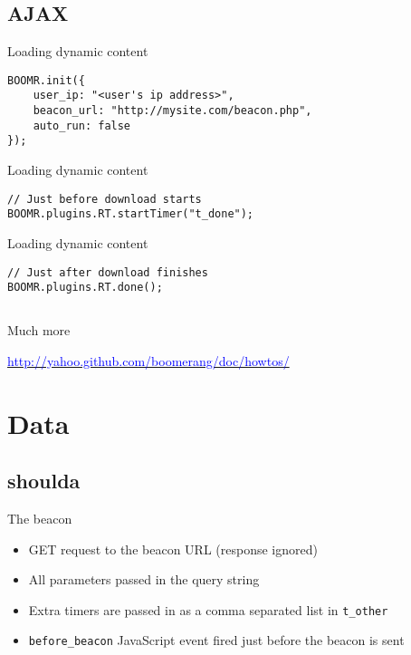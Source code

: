 \documentclass{beamer}
\begin{document}
\subsection{AJAX}
\begin{frame}[fragile]{Loading dynamic content}
\begin{verbatim}
BOOMR.init({
    user_ip: "<user's ip address>",
    beacon_url: "http://mysite.com/beacon.php",
    auto_run: false
});
\end{verbatim}
\end{frame}

\begin{frame}[fragile]{Loading dynamic content}
\begin{verbatim}
// Just before download starts
BOOMR.plugins.RT.startTimer("t_done");
\end{verbatim}
\end{frame}

\begin{frame}[fragile]{Loading dynamic content}
\begin{verbatim}
// Just after download finishes
BOOMR.plugins.RT.done();
\end{verbatim}
\end{frame}

\subsection{}

\begin{frame}{Much more}
  \begin{center}
  \href{http://yahoo.github.com/boomerang/doc/howtos/}{\textcolor{blue}{http://yahoo.github.com/boomerang/doc/howtos/}}
  \end{center}
\end{frame}

\section{Data}
\label{sec:data}

\subsection{shoulda}

\begin{frame}{The beacon}
  \begin{itemize}
  \item GET request to the beacon URL (response ignored)
  \item All parameters passed in the query string
  \item Extra timers are passed in as a comma separated list in \texttt{t\_other}
  \item \texttt{before\_beacon} JavaScript event fired just before the beacon is sent
  \end{itemize}
\end{frame}
\end{document}

